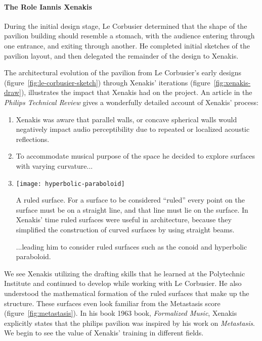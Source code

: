 \paragraph{The Role Iannis Xenakis} During the initial design stage,
Le Corbusier determined that the shape of the pavilion building should
resemble a stomach, with the audience entering through one entrance,
and exiting through another. He completed initial sketches of the
pavilion layout, and then delegated the remainder of the design to
Xenakis.\cite{Clarke2012}

The architectural evolution of the pavilion from Le Corbusier's early
designs (figure~\ref{fig:le-corbusier-sketch}) through Xenakis'
iterations (figure~\ref{fig:xenakis-draw}), illustrates the impact
that Xenakis had on the project. An article in the \textit{Philips
  Technical Review}\cite{philips1958} gives a wonderfully detailed
account of Xenakis' process:
\begin{enumerate}
\item Xenakis was aware that parallel walls, or concave spherical
  walls would negatively impact audio perceptibility due to repeated
  or localized acoustic reflections.
\item To accommodate musical purpose of the space he decided to
  explore surfaces with varying curvature...
\item 
  \begin{marginfigure}
    \texttt{[image: hyperbolic-paraboloid]}
    \caption{A ruled surface. For a surface to be considered ``ruled''
      every point on the surface must be on a straight line, and that
      line must lie on the surface. In Xenakis' time ruled surfaces
      were useful in architecture, because they simplified the
      construction of curved surfaces by using straight beams.}
    \label{fig:ruled-surface}
  \end{marginfigure}...leading him to consider ruled surfaces such as
  the conoid and hyperbolic paraboloid. 
\end{enumerate}
We see Xenakis utilizing the drafting skills that he learned at the
Polytechnic Institute and continued to develop while working with Le
Corbusier. He also understood the mathematical formation of the ruled
surfaces that make up the structure. These surfaces even look familiar
from the Metastasis score (figure~\ref{fig:metastasis}). In his book
1963 book, \textit{Formalized Music}, Xenakis explicitly states that
the philips pavilion was inspired by his work on
\textit{Metastasis}. We begin to see the value of Xenakis' training in
different fields.

